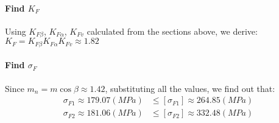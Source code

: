 \paragraph{Find $ K_F $}
Using $ K_{F\beta} $, $ K_{F\alpha} $, $ K_{Fv} $ calculated from the sections above, we derive:\\ $ K_F = K_{F\beta}K_{F\alpha}K_{Fv} \approx 1.82 $
\paragraph{Find $ \sigma_F $} Since $ m_n = m\cos\beta \approx 1.42$, substituting all the values, we find out that:
\begin{align*}
	\sigma_{F1} \approx 179.07\unit{(MPa)} & \leq [\sigma_{F1}]\approx264.85\unit{(MPa)}\\
	\sigma_{F2} \approx 181.06\unit{(MPa)} & \leq [\sigma_{F2}]\approx332.48\unit{(MPa)}
\end{align*}


